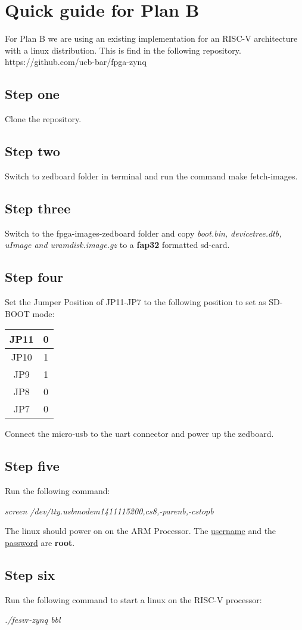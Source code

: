 
\chapter{Quick guide for Plan B}

For Plan B we are using an existing implementation for an RISC-V architecture with a linux distribution. 
This is find in the following repository. 
https://github.com/ucb-bar/fpga-zynq 

\section{Step one}
Clone the repository.

\section{Step two}
Switch to zedboard folder in terminal and run the command make fetch-images.
\section{Step three}
Switch to the fpga-images-zedboard folder and copy \textit{boot.bin, devicetree.dtb, uImage and uramdisk.image.gz} to a \textbf{fap32} formatted sd-card.
\section{Step four}
Set the Jumper Position of JP11-JP7 to the following position to set as SD-BOOT mode:

\begin{tabular}{|c|c|} \hline
 JP11 & 0 \\ \hline
 JP10 & 1 \\ \hline
 JP9  & 1 \\ \hline
 JP8  & 0 \\ \hline
 JP7  & 0 \\ \hline
\end{tabular}

Connect the micro-usb to the uart connector and power up the zedboard.
\section{Step five}
Run the following command:

\textit{screen /dev/tty.usbmodem1411115200,cs8,-parenb,-cstopb}

The linux should power on on the ARM Processor.
The \underline{username} and the \underline{password} are \textbf{root}.

\section{Step six}
Run the following command to start a linux on the RISC-V processor:

\textit{./fesvr-zynq bbl}
